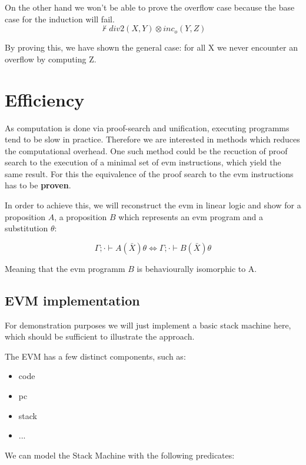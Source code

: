 \documentclass[sigconf]{acmart}
\begin{document}
On the other hand we won't be able to prove the overflow case because the base case for the induction will fail.
\[ \not\vdash div2(X,Y)\otimes inc_o(Y,Z) \]

By proving this, we have shown the general case: for all X we never encounter an overflow by computing Z.



\section{Efficiency}
As computation is done via proof-search and unification, executing programms tend to be slow in practice. Therefore we are interested in methods which reduces the computational overhead. One such method could be the recuction of proof search to the execution of a minimal set of evm instructions, which yield the same result. For this the equivalence of the proof search to the evm instructions has to be \textbf{proven}.

In order to achieve this, we will reconstruct the evm in linear logic and show for a proposition $A$, a proposition $B$ which represents an evm program and a substitution $\theta$:

\[ \Gamma; \cdot \vdash A(\bar X)\theta \Leftrightarrow \Gamma; \cdot \vdash B(\bar X)\theta \]


Meaning that the evm programm $B$ is behaviourally isomorphic to A.

\subsection*{EVM implementation}
For demonstration purposes we will just implement a basic stack machine here, which should be sufficient to illustrate the approach.

The EVM has a few distinct components, such as:

\begin{itemize}
  \item code
  \item pc
  \item stack
  \item ...
\end{itemize}


We can model the Stack Machine with the following predicates:
\end{document}
